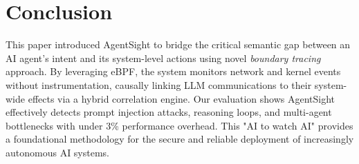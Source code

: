 

\section{Conclusion}

This paper introduced AgentSight to bridge the critical semantic gap between an AI agent's intent and its system-level actions using novel \textit{boundary tracing} approach. By leveraging eBPF, the system monitors network and kernel events without instrumentation, causally linking LLM communications to their system-wide effects via a hybrid correlation engine. Our evaluation shows AgentSight effectively detects prompt injection attacks, reasoning loops, and multi-agent bottlenecks with under 3\% performance overhead. This "AI to watch AI" provides a foundational methodology for the secure and reliable deployment of increasingly autonomous AI systems.





